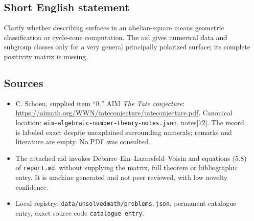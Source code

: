 \documentclass[11pt]{article}
\begin{document}
\subsection{Short English statement}
Clarify whether describing surfaces in an abelian-square means geometric classification or cycle-cone computation. The aid gives numerical data and subgroup classes only for a very general principally polarized surface; its complete positivity matrix is missing.
\subsection{Sources}
\begin{itemize}
\item C. Schoen, supplied item ``0,'' AIM \emph{The Tate conjecture}: \url{https://aimath.org/WWN/tateconjecture/tateconjecture.pdf}. Canonical location: \texttt{aim-algebraic-number-theory-notes.json}, notes[72]. The record is labeled exact despite unexplained surrounding numerals; remarks and literature are empty. No PDF was consulted.
\item The attached aid invokes Debarre--Ein--Lazarsfeld--Voisin and equations (5.8) of \texttt{report.md}, without supplying the matrix, full theorem or bibliographic entry. It is machine generated and not peer reviewed, with low novelty confidence.
\item Local registry: \texttt{data/unsolvedmath/problems.json}, permanent catalogue entry, exact source code \texttt{catalogue entry}.
\end{itemize}
\end{document}
